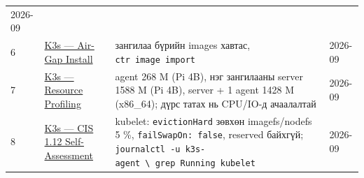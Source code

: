 \begin{longtable}[]{@{}llll@{}}
\begin{minipage}[t]{0.22\columnwidth}
2026-09\strut
\end{minipage}\tabularnewline
\begin{minipage}[t]{0.22\columnwidth}\raggedright
6\strut
\end{minipage} & \begin{minipage}[t]{0.22\columnwidth}\raggedright
\href{https://docs.k3s.io/installation/airgap}{K3s --- Air-Gap Install}\strut
\end{minipage} & \begin{minipage}[t]{0.22\columnwidth}\raggedright
зангилаа бүрийн images хавтас, \texttt{ctr\ image\ import}\strut
\end{minipage} & \begin{minipage}[t]{0.22\columnwidth}\raggedright
2026-09\strut
\end{minipage}\tabularnewline
\begin{minipage}[t]{0.22\columnwidth}\raggedright
7\strut
\end{minipage} & \begin{minipage}[t]{0.22\columnwidth}\raggedright
\href{https://docs.k3s.io/reference/resource-profiling}{K3s --- Resource Profiling}\strut
\end{minipage} & \begin{minipage}[t]{0.22\columnwidth}\raggedright
agent 268 M (Pi 4B), нэг зангилааны server 1588 M (Pi 4B), server + 1 agent 1428 M (x86\_64); дүрс татах нь CPU/IO-д ачаалалтай\strut
\end{minipage} & \begin{minipage}[t]{0.22\columnwidth}\raggedright
2026-09\strut
\end{minipage}\tabularnewline
\begin{minipage}[t]{0.22\columnwidth}\raggedright
8\strut
\end{minipage} & \begin{minipage}[t]{0.22\columnwidth}\raggedright
\href{https://docs.k3s.io/security/self-assessment-1.12}{K3s --- CIS 1.\allowbreak{}12 Self-Assessment}\strut
\end{minipage} & \begin{minipage}[t]{0.22\columnwidth}\raggedright
kubelet: \texttt{evictionHard} зөвхөн imagefs/nodefs 5 \%, \texttt{failSwapOn:\allowbreak{}\ false}, reserved байхгүй; \texttt{journalctl\ -u\ k3s-agent\ \textbackslash{}\textbar{}\ grep\ \textquotesingle{}Running\ kubelet\textquotesingle{}}\strut
\end{minipage} & \begin{minipage}[t]{0.22\columnwidth}\raggedright
2026-09\strut

\end{minipage}
\end{longtable}
